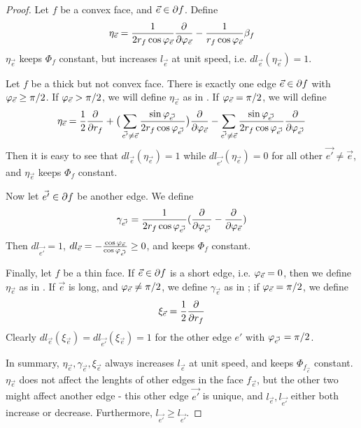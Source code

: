 \begin{proof}
Let $f$ be a convex face, and $\vec{e} \in \partial f$. Define
\begin{equation}
\label{e:eta_e}
\eta_{\vec{e}} =
\frac{1}{2 r_f \cos \varphi_{\vec{e}}} {\frac{\partial}{\partial \varphi_{\vec{e}}}}
- \frac{1}{r_f \cos \varphi_{\vec{e}}} \beta_f
\end{equation}
$\eta_{\vec{e}}$ keeps $\Phi_f$ constant, but increases $l_{\vec{e}}$
at unit speed, i.e. $dl_{\vec{e}}(\eta_{\vec{e}}) = 1$.


Let $f$ be a thick but not convex face.
There is exactly one edge $\vec{e} \in \partial f$
with $\varphi_{\vec{e}} \geq \pi/2$.
If $\varphi_{\vec{e}} > \pi/2$, we will define
$\eta_{\vec{e}}$ as in .
If $\varphi_{\vec{e}} = \pi/2$,
we will define
\begin{equation}
\label{e:eta_e_2}
\eta_{\vec{e}} = \frac{1}{2}{\frac{\partial}{\partial r_f}}
+ \big(\sum_{\vec{e'} \neq \vec{e}}
	\frac{\sin \varphi_{\vec{e'}}}{2 r_f \cos \varphi_{\vec{e'}}}\big)
	{\frac{\partial}{\partial \varphi_{\vec{e}}}}
- \sum_{\vec{e'} \neq \vec{e}}
	\frac{\sin \varphi_{\vec{e'}}}{2 r_f \cos \varphi_{\vec{e'}}}
	{\frac{\partial}{\partial \varphi_{\vec{e'}}}}
\end{equation}
Then it is easy to see that
$dl_{\vec{e}}(\eta_{\vec{e}}) = 1$
while
$dl_{\vec{e'}}(\eta_{\vec{e}}) = 0$
for all other $\vec{e'} \neq \vec{e}$,
and $\eta_{\vec{e}}$ keeps $\Phi_f$ constant.


Now let $\vec{e'} \in \partial f$ be another edge.
We define
\begin{equation}
\label{e:gamma_e}
\gamma_{\vec{e'}} = \frac{1}{2 r_f \cos{\varphi_{\vec{e'}}}}
	({\frac{\partial}{\partial \varphi_{\vec{e'}}}} - {\frac{\partial}{\partial \varphi_{\vec{e}}}})
\end{equation}
Then $dl_{\vec{e'}} = 1$,
$dl_{\vec{e}} = -\frac{\cos \varphi_{\vec{e}}}{\cos \varphi_{\vec{e'}}} \geq 0$,
and keeps $\Phi_f$ constant.


Finally, let $f$ be a thin face.
If $\vec{e} \in \partial f$ is a short edge,
i.e. $\varphi_{\vec{e}} = 0$,
then we define $\eta_{\vec{e}}$ as in .
If $\vec{e}$ is long, and $\varphi_{\vec{e}} \neq \pi/2$,
we define $\gamma_{\vec{e}}$ as in ;
if $\varphi_{\vec{e}} = \pi/2$, we define
\begin{equation}
\label{e:xi_e}
\xi_{\vec{e}} = \frac{1}{2}{\frac{\partial}{\partial r_f}}
\end{equation}
Clearly $dl_{\vec{e}}(\xi_{\vec{e}}) = dl_{\vec{e'}}(\xi_{\vec{e}}) = 1$
for the other edge $e'$ with $\varphi_{\vec{e'}} = \pi/2$.


In summary,
$\eta_{\vec{e}}, \gamma_{\vec{e}}, \xi_{\vec{e}}$
always increases $l_{\vec{e}}$ at unit speed,
and keeps $\Phi_{f_{\vec{e}}}$ constant.
$\eta_{\vec{e}}$ does not affect the lenghts of other edges
in the face $f_{\vec{e}}$,
but the other two might affect another edge
- this other edge $\vec{e'}$ is unique,
and $l_{\vec{e}}, l_{\vec{e'}}$ either both increase
or decrease.
Furthermore, $l_{\vec{e'}} \geq l_{\vec{e'}}$.



\end{proof}

